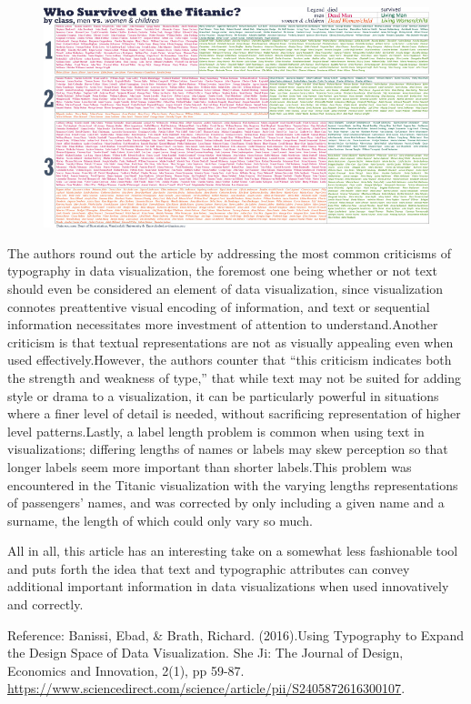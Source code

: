 \documentclass[]{book}
\theoremstyle{definition}
\theoremstyle{definition}
\theoremstyle{definition}
\theoremstyle{remark}
\begin{document}
\begin{figure}
\centering
\includegraphics{images/TypographicTitanic.jpg}
\caption{}
\end{figure}

The authors round out the article by addressing the most common
criticisms of typography in data visualization, the foremost one being
whether or not text should even be considered an element of data
visualization, since visualization connotes preattentive visual encoding
of information, and text or sequential information necessitates more
investment of attention to understand.Another criticism is that textual
representations are not as visually appealing even when used
effectively.However, the authors counter that ``this criticism indicates
both the strength and weakness of type,'' that while text may not be
suited for adding style or drama to a visualization, it can be
particularly powerful in situations where a finer level of detail is
needed, without sacrificing representation of higher level
patterns.Lastly, a label length problem is common when using text in
visualizations; differing lengths of names or labels may skew perception
so that longer labels seem more important than shorter labels.This
problem was encountered in the Titanic visualization with the varying
lengths representations of passengers' names, and was corrected by only
including a given name and a surname, the length of which could only
vary so much.

All in all, this article has an interesting take on a somewhat less
fashionable tool and puts forth the idea that text and typographic
attributes can convey additional important information in data
visualizations when used innovatively and correctly.

Reference: Banissi, Ebad, \& Brath, Richard. (2016).Using Typography to
Expand the Design Space of Data Visualization. She Ji: The Journal of
Design, Economics and Innovation, 2(1), pp 59-87.
\url{https://www.sciencedirect.com/science/article/pii/S2405872616300107}.
\end{document}
